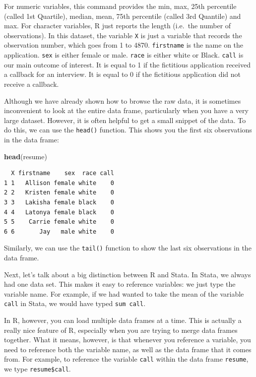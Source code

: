 \documentclass[
]{book}
\newenvironment{Shaded}{\begin{snugshade}}{\end{snugshade}}
\newcommand{\FunctionTok}[1]{\textcolor[rgb]{0.13,0.29,0.53}{\textbf{#1}}}
\newcommand{\NormalTok}[1]{#1}
\begin{document}
For numeric variables, this command provides the min, max, 25th percentile (called 1st Quartile), median, mean, 75th percentile (called 3rd Quantile) and max. For character variables, R just reports the length (i.e.~the number of observations). In this dataset, the variable \texttt{X} is just a variable that records the observation number, which goes from 1 to 4870. \texttt{firstname} is the name on the application. \texttt{sex} is either female or male. \texttt{race} is either white or Black. \texttt{call} is our main outcome of interest. It is equal to 1 if the fictitious application received a callback for an interview. It is equal to 0 if the fictitious application did not receive a callback.

Although we have already shown how to browse the raw data, it is sometimes inconvenient to look at the entire data frame, particularly when you have a very large dataset. However, it is often helpful to get a small snippet of the data. To do this, we can use the \texttt{head()} function. This shows you the first six observations in the data frame:

\begin{Shaded}
\begin{Highlighting}[]
\FunctionTok{head}\NormalTok{(resume)}
\end{Highlighting}
\end{Shaded}

\begin{verbatim}
  X firstname    sex  race call
1 1   Allison female white    0
2 2   Kristen female white    0
3 3   Lakisha female black    0
4 4   Latonya female black    0
5 5    Carrie female white    0
6 6       Jay   male white    0
\end{verbatim}

Similarly, we can use the \texttt{tail()} function to show the last six observations in the data frame.

Next, let's talk about a big distinction between R and Stata. In Stata, we always had one data set. This makes it easy to reference variables: we just type the variable name. For example, if we had wanted to take the mean of the variable \texttt{call} in Stata, we would have typed \texttt{sum\ call}.

In R, however, you can load multiple data frames at a time. This is actually a really nice feature of R, especially when you are trying to merge data frames together. What it means, however, is that whenever you reference a variable, you need to reference both the variable name, as well as the data frame that it comes from. For example, to reference the variable \texttt{call} within the data frame \texttt{resume}, we type \texttt{resume\$call}.
\end{document}
